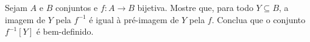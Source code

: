 \begin{exercise}
Sejam $A$ e $B$ conjuntos e $f: A \to B$ bijetiva. Mostre que, para todo $Y \subseteq B$, a imagem de $Y$ pela $f^{-1}$ é igual à pré-imagem de $Y$ pela $f$. Conclua que o conjunto $f^{-1}[Y]$ é bem-definido.
\end{exercise}